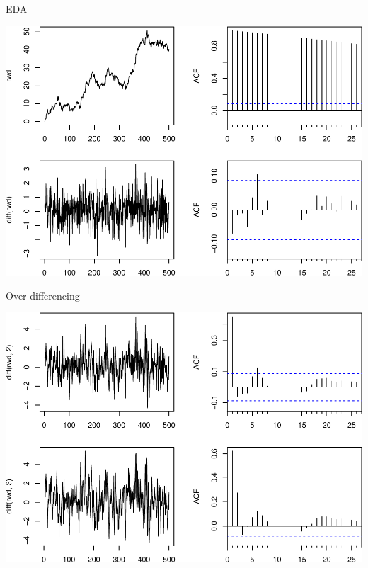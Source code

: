 \documentclass[11pt,ignorenonframetext,]{beamer}
\begin{document}
\begin{frame}{%
\protect\hypertarget{eda}{%
EDA}}

\begin{center}\includegraphics[width=\textwidth]{Lec09_files/figure-beamer/unnamed-chunk-7-1} \end{center}

\end{frame}

\begin{frame}{%
\protect\hypertarget{over-differencing}{%
Over differencing}}

\begin{center}\includegraphics[width=\textwidth]{Lec09_files/figure-beamer/unnamed-chunk-8-1} \end{center}

\end{frame}
\end{document}
